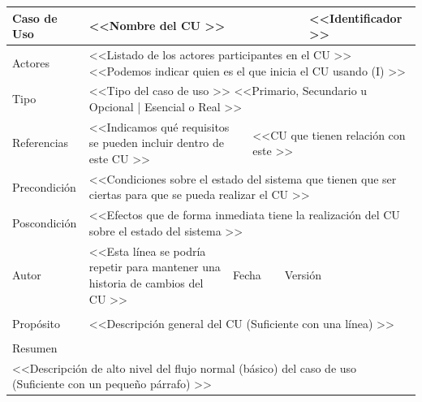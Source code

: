 


\begin{table}[h!]
\centering
\renewcommand{\arraystretch}{1.5}
\begin{tabular}{|l|lllllll|}
\hline
\multicolumn{1}{|l|}{Caso de Uso} & \multicolumn{5}{l|}{\textless{}\textless Nombre del CU \textgreater{}\textgreater{}} & \multicolumn{2}{l|}{\cellcolor[HTML]{E5E5E5}\textless{}\textless Identificador \textgreater{}\textgreater{}} \\ \hline
\multicolumn{1}{|l|}{Actores} & \multicolumn{7}{l|}{\textless{}\textless Listado de los actores participantes en el CU \textgreater{}\textgreater{} \textless{}\textless Podemos indicar quien es el que inicia el CU usando (I) \textgreater{}\textgreater{}} \\ \hline
\multicolumn{1}{|l|}{Tipo} & \multicolumn{7}{l|}{\textless{}\textless Tipo del caso de uso \textgreater{}\textgreater{} \textless{}\textless Primario, Secundario u Opcional | Esencial o Real \textgreater{}\textgreater{}} \\ \hline
\multicolumn{1}{|l|}{Referencias} & \multicolumn{2}{l|}{\textless{}\textless Indicamos qué requisitos se pueden incluir dentro de este CU \textgreater{}\textgreater{}} & \multicolumn{5}{l|}{\textless{}\textless CU que tienen relación con este \textgreater{}\textgreater{}} \\ \hline
\multicolumn{1}{|l|}{Precondición} & \multicolumn{7}{l|}{\textless{}\textless Condiciones sobre el estado del sistema que tienen que ser ciertas para que se pueda realizar el CU \textgreater{}\textgreater{}} \\ \hline
\multicolumn{1}{|l|}{Poscondición} & \multicolumn{7}{l|}{\textless{}\textless Efectos que de forma inmediata tiene la realización del CU sobre el estado del sistema \textgreater{}\textgreater{}} \\ \hline
\multicolumn{1}{|l|}{Autor} & \multicolumn{1}{l|}{\textless{}\textless Esta línea se podría repetir para mantener una historia de cambios del CU \textgreater{}\textgreater{}} & \multicolumn{2}{l|}{Fecha} & \multicolumn{1}{l|}{} & \multicolumn{2}{l|}{Versión} & \multicolumn{1}{l|}{} \\ \hline
\multicolumn{8}{l}{} \\ \hline
\multicolumn{1}{|l|}{\cellcolor[HTML]{F2F2F2}Propósito} & \multicolumn{7}{l|}{\textless{}\textless Descripción general del CU (Suficiente con una línea) \textgreater{}\textgreater{}} \\ \hline
\multicolumn{8}{l}{} \\ \hline
\multicolumn{8}{|l|}{\cellcolor[HTML]{F2F2F2}Resumen} \\ \hline
\multicolumn{8}{|l|}{\textless{}\textless Descripción de alto nivel del flujo normal (básico) del caso de uso (Suficiente con un pequeño párrafo) \textgreater{}\textgreater{}} \\ \hline
\end{tabular}
\end{table}

